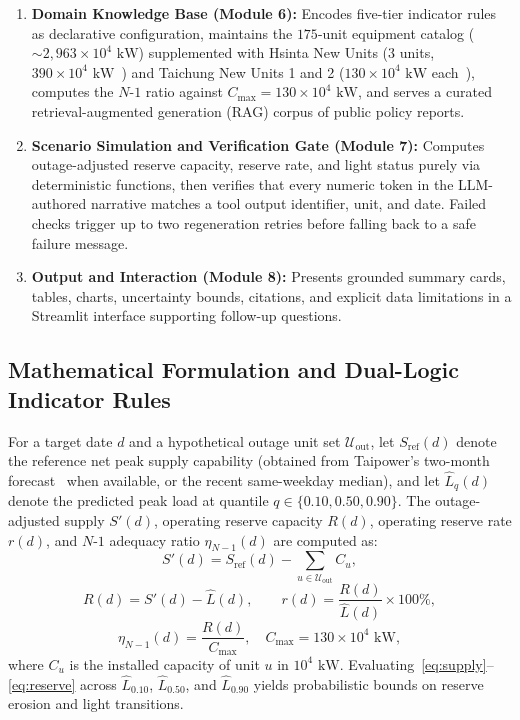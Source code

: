 \documentclass[conference]{IEEEtran}
\begin{document}
\begin{enumerate}
    \item \textbf{Domain Knowledge Base (Module 6):} Encodes five-tier indicator rules as declarative configuration, maintains the $175$-unit equipment catalog ($\sim 2{,}963 \times 10^4\text{ kW}$) supplemented with Hsinta New Units ($3$ units, $390 \times 10^4\text{ kW}$~\cite{ref18}) and Taichung New Units 1 and 2 ($130 \times 10^4\text{ kW}$ each~\cite{ref31}), computes the $N\text{-}1$ ratio against $C_{\max} = 130 \times 10^4\text{ kW}$, and serves a curated retrieval-augmented generation (RAG) corpus of public policy reports.
    \item \textbf{Scenario Simulation and Verification Gate (Module 7):} Computes outage-adjusted reserve capacity, reserve rate, and light status purely via deterministic functions, then verifies that every numeric token in the LLM-authored narrative matches a tool output identifier, unit, and date. Failed checks trigger up to two regeneration retries before falling back to a safe failure message.
    \item \textbf{Output and Interaction (Module 8):} Presents grounded summary cards, tables, charts, uncertainty bounds, citations, and explicit data limitations in a Streamlit interface supporting follow-up questions.
\end{enumerate}

\subsection{Mathematical Formulation and Dual-Logic Indicator Rules}
\label{sec:formulation}

For a target date $d$ and a hypothetical outage unit set $\mathcal{U}_{\text{out}}$, let $S_{\text{ref}}(d)$ denote the reference net peak supply capability (obtained from Taipower's two-month forecast~\cite{ref2} when available, or the recent same-weekday median), and let $\hat{L}_{q}(d)$ denote the predicted peak load at quantile $q \in \{0.10, 0.50, 0.90\}$. The outage-adjusted supply $S'(d)$, operating reserve capacity $R(d)$, operating reserve rate $r(d)$, and $N\text{-}1$ adequacy ratio $\eta_{N-1}(d)$ are computed as:
\begin{equation}
S'(d) = S_{\text{ref}}(d) - \sum_{u \in \mathcal{U}_{\text{out}}} C_u,
\label{eq:supply}
\end{equation}
\begin{equation}
R(d) = S'(d) - \hat{L}(d), \qquad r(d) = \frac{R(d)}{\hat{L}(d)} \times 100\%,
\label{eq:reserve}
\end{equation}
\begin{equation}
\eta_{N-1}(d) = \frac{R(d)}{C_{\max}}, \quad C_{\max} = 130 \times 10^4\text{ kW},
\label{eq:n1}
\end{equation}
where $C_u$ is the installed capacity of unit $u$ in $10^4\text{ kW}$. Evaluating~\eqref{eq:supply}--\eqref{eq:reserve} across $\hat{L}_{0.10}$, $\hat{L}_{0.50}$, and $\hat{L}_{0.90}$ yields probabilistic bounds on reserve erosion and light transitions.
\end{document}
